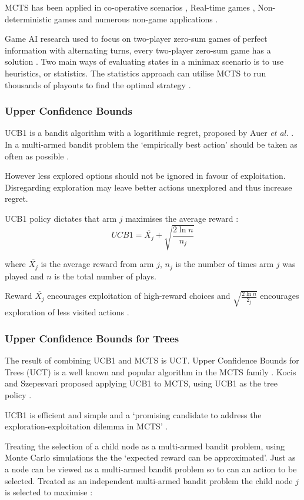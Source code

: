 MCTS has been applied in co-operative scenarios \cite{b5}, Real-time games \cite{b2}, Non-deterministic games \cite{b7} and numerous non-game applications \cite{b2}.

Game AI research used to focus on two-player zero-sum games of perfect information with alternating turns\cite{b2}, every two-player zero-sum game has a solution \cite{bartle}. Two main ways of evaluating states in a minimax scenario is to use heuristics, or statistics. The statistics approach can utilise MCTS to run thousands of playouts to find the optimal strategy \cite{bartle}.

\subsubsection{Upper Confidence Bounds}
UCB1 is a bandit algorithm with a logarithmic regret, proposed by Auer {\em et al.} \cite{ucb1}. In a multi-armed bandit problem the `empirically best action' should be taken as often as possible \cite{ucb1}. 

However less explored options should not be ignored in favour of exploitation. Disregarding exploration may leave better actions unexplored and thus increase regret. 

UCB1 policy dictates that arm $j$ maximises the average reward \cite{ucb1}:
\[UCB1 = \overline{X_{j}} + \sqrt{\frac{2 \ln n}{n_{j}}}\]

where $\overline{X_{j}}$ is the average reward from arm $j$, $n_{j}$ is the number of times arm $j$ was played and $n$ is the total number of plays.

Reward $\overline{X_{j}}$ encourages exploitation of high-reward choices \cite{ucb1} and $\sqrt{\frac{2 \ln n}{2_{j}}}$ encourages exploration of less visited actions \cite{b2}.

\subsubsection{Upper Confidence Bounds for Trees}
The result of combining UCB1 and MCTS is UCT. Upper Confidence Bounds for Trees (UCT) is a well known and popular algorithm in the MCTS family \cite{b2}. Kocis and Szepesvari \cite{kocsze} proposed applying UCB1 to MCTS, using UCB1 as the tree policy \cite{b2}.

UCB1 is efficient and simple \cite{b2} and a `promising candidate to address the exploration-exploitation dilemma in MCTS' \cite{b2}.

Treating the selection of a child node as a multi-armed bandit problem, using Monte Carlo simulations the the `expected reward can be approximated'. Just as a node can be viewed as a multi-armed bandit problem so to can an action to be selected. Treated as an independent multi-armed bandit problem the child node $j$ is selected to maximise \cite{b2}:

